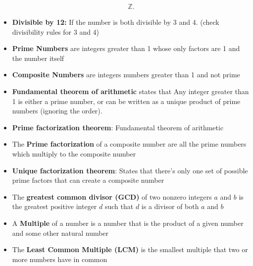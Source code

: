 \documentclass{report}
\begin{document}
\begin{itemize}
\begin{align*}
              \mathbb{Z}
            .\end{align*}
          \item \textbf{Divisible by 12:}  If the number is both divisible by 3 and 4. (check divisibility rules for 3 and 4)
      \item \textbf{Prime Numbers} are integers greater than 1 whose only factors are 1 and the number itself
      \item \textbf{Composite Numbers} are integers numbers greater than 1 and not prime
      \item \textbf{Fundamental theorem of arithmetic} states that Any integer greater than 1 is either a prime number, or can be written as a unique product of prime numbers (ignoring the order).
      \item \textbf{Prime factorization theorem}: Fundamental theorem of arithmetic
      \item The \textbf{Prime factorization} of a composite number are all the prime numbers which multiply to the composite number 
        \item \textbf{Unique factorization theorem}: States that there's only one set of possible prime factors that can create a composite number
        \item The \textbf{greatest common divisor (GCD)} of two nonzero integers $a $ and $b $ is the greatest positive integer $d $ such that $d $ is a divisor of both $a $ and $b $
        \item A \textbf{Multiple} of a number is a number that is the product of a given number and some other natural number
        \item  The \textbf{Least Common Multiple (LCM)} is the smallest multiple that two or more numbers have in common
      \end{itemize}

      \pagebreak \bigbreak \noindent 
\end{document}
